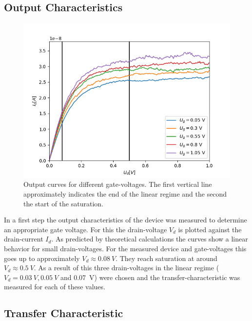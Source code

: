 \documentclass[%
 reprint,
amsmath,amssymb,
pra,
]{revtex4-1}
\begin{document}
\subsection{Output Characteristics}
\begin{figure}[h]
\centering
\includegraphics[scale=0.55]{Bilder/output.png}
\caption{Output curves for different gate-voltages. The first vertical line approximately indicates the end of the linear regime and the second the start of the saturation.}
\label{fig:output}
\end{figure}

In a first step the output characteristics of the device was measured to determine an appropriate gate voltage. For this the drain-voltage  $V_d$ is plotted against the drain-current $I_d$. As predicted by theoretical calculations the curves show a linear behavior for small drain-voltages. For the measured device and gate-voltages this goes up to approximately $V_d \approx \SI{0.08}{V}$. They reach saturation at around $V_d \approx \SI{0.5}{V}$. As a result of this three drain-voltages in the linear regime ($V_d = \SI{0.03}{V},\SI{0.05}{V} $ and \SI{0.07}{V}) were chosen and the transfer-characteristic was measured for each of these values.

\subsection{Transfer Characteristic}
\end{document}
